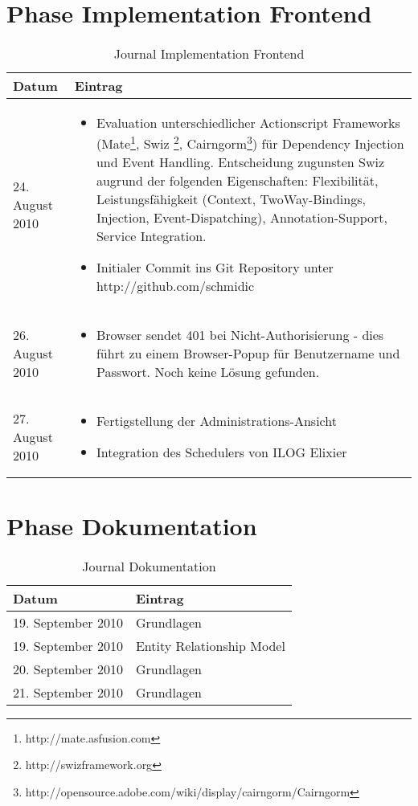   \section{Phase Implementation Frontend}
  \begin{spacing}{0.5}
  \begin{longtable}{|p{4cm}|p{10cm}|}
      \caption{Journal Implementation Frontend}\\
\hline
  Datum & Eintrag\\
  \hline
  24. August 2010 & 
  \begin{itemize}
  \item Evaluation unterschiedlicher Actionscript Frameworks (Mate\footnote{http://mate.asfusion.com}, Swiz \footnote{http://swizframework.org}, Cairngorm\footnote{http://opensource.adobe.com/wiki/display/cairngorm/Cairngorm}) f\"ur Dependency Injection und Event Handling. Entscheidung zugunsten Swiz augrund der folgenden Eigenschaften: Flexibilit\"at, Leistungsf\"ahigkeit (Context, TwoWay-Bindings, Injection, Event-Dispatching), Annotation-Support, Service Integration.
  \item Initialer Commit ins Git Repository unter http://github.com/schmidic
  \end{itemize}\\
  \hline
  
 26. August 2010 & 
  \begin{itemize}
  \item Browser sendet 401 bei Nicht-Authorisierung - dies f\"uhrt zu einem Browser-Popup f\"ur Benutzername und Passwort. Noch keine L\"osung gefunden. 
  \end{itemize}\\
  \hline
  
 27. August 2010 & 
  \begin{itemize}
  \item Fertigstellung der Administrations-Ansicht
  \item Integration des Schedulers von ILOG Elixier
  \end{itemize}\\
  \hline
    \end{longtable}
  \end{spacing}
  
  
    \section{Phase Dokumentation}
  \begin{longtable}{|p{4cm}|p{10cm}|}
      \caption{Journal Dokumentation}\\
\hline
  Datum & Eintrag\\
   \hline
  19. September 2010 & Grundlagen\\\hline
    19. September 2010 & Entity Relationship Model\\\hline
    20. September 2010 & Grundlagen\\\hline
    21. September 2010 & Grundlagen\\\hline
    \end{longtable}
  

